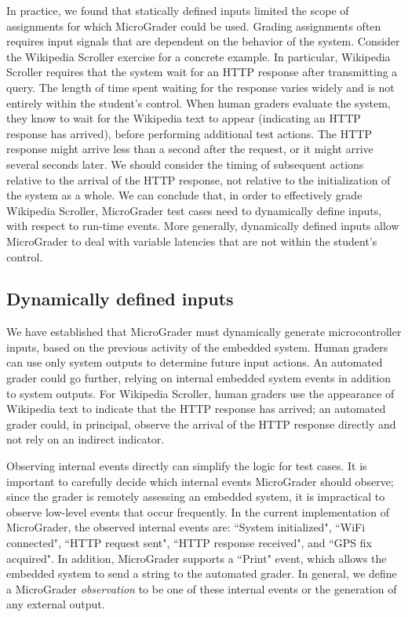 \documentclass[12pt]{article}
\begin{document}
In practice, we found that statically defined inputs limited the scope of assignments for which MicroGrader could be used.  Grading assignments often requires input signals that are dependent on the behavior of the system.  Consider the Wikipedia Scroller exercise for a concrete example.  In particular, Wikipedia Scroller requires that the system wait for an HTTP response after transmitting a query.  The length of time spent waiting for the response varies widely and is not entirely within the student's control.  When human graders evaluate the system, they know to wait for the Wikipedia text to appear (indicating an HTTP response has arrived), before performing additional test actions.  The HTTP response might arrive less than a second after the request, or it might arrive several seconds later.  We should consider the timing of subsequent actions relative to the arrival of the HTTP response, not relative to the initialization of the system as a whole.  We can conclude that, in order to effectively grade Wikipedia Scroller, MicroGrader test cases need to dynamically define inputs, with respect to run-time events.  More generally, dynamically defined inputs allow MicroGrader to deal with variable latencies that are not within the student's control.

\subsection{Dynamically defined inputs}
We have established that MicroGrader must dynamically generate microcontroller inputs, based on the previous activity of the embedded system.  Human graders can use only system outputs to determine future input actions.  An automated grader could go further, relying on internal embedded system events in addition to system outputs.  For Wikipedia Scroller, human graders use the appearance of Wikipedia text to indicate that the HTTP response has arrived; an automated grader could, in principal, observe the arrival of the HTTP response directly and not rely on an indirect indicator.

Observing internal events directly can simplify the logic for test cases.  It is important to carefully decide which internal events MicroGrader should observe; since the grader is remotely assessing an embedded system, it is impractical to observe low-level events that occur frequently.  In the current implementation of MicroGrader, the observed internal events are: ``System initialized", ``WiFi connected", ``HTTP request sent", ``HTTP response received", and ``GPS fix acquired".  In addition, MicroGrader supports a ``Print" event, which allows the embedded system to send a string to the automated grader.  In general, we define a MicroGrader \textit{observation} to be one of these internal events or the generation of any external output.
\end{document}
